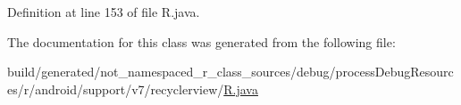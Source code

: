 Definition at line 153 of file R.\+java.



The documentation for this class was generated from the following file\+:\begin{DoxyCompactItemize}
\item 
build/generated/not\+\_\+namespaced\+\_\+r\+\_\+class\+\_\+sources/debug/process\+Debug\+Resources/r/android/support/v7/recyclerview/\mbox{\hyperlink{android_2support_2v7_2recyclerview_2_r_8java}{R.\+java}}\end{DoxyCompactItemize}
